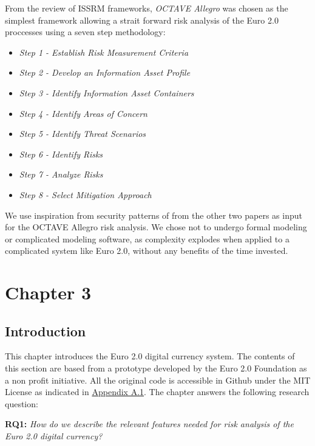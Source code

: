 \documentclass[a4paper,12pt]{article} %
\begin{document}
From the review of ISSRM frameworks, \textit{OCTAVE Allegro} was chosen as the simplest framework allowing a strait forward risk analysis of the Euro 2.0 proccesses using a seven step methodology\cite{CaralliIntroducingOCTAVE2007}:

\begin{itemize}
	\item \textit{Step 1 - Establish Risk Measurement Criteria}
	\item \textit{Step 2 - Develop an Information Asset Profile}
	\item \textit{Step 3 - Identify Information Asset Containers}
	\item \textit{Step 4 - Identify Areas of Concern}
	\item \textit{Step 5 - Identify Threat Scenarios}
	\item \textit{Step 6 - Identify Risks}
	\item \textit{Step 7 - Analyze Risks}
	\item \textit{Step 8 - Select Mitigation Approach}
\end{itemize}

We use inspiration from security patterns of from the other two papers as input for the OCTAVE Allegro risk analysis. We chose not to undergo formal modeling or complicated modeling software, as complexity explodes when applied to a complicated system like Euro 2.0, without any benefits of the time invested.

\pagebreak

\section{Chapter 3} \label{sec:3}

\subsection{Introduction} \label{ssec:3.1}
This chapter introduces the Euro 2.0 digital currency system. The contents of this section are based from a prototype developed by the Euro 2.0 Foundation as a non profit initiative. All the original code is accessible in Github under the MIT License as indicated in \hyperref[ssec:a.1]{Appendix A.1}. The chapter answers the following research question:

\begin{quoting}
\textbf{RQ1:} \textit{How do we describe the relevant features needed for risk analysis of the Euro 2.0 digital currency?}
\end{quoting}
\end{document}
